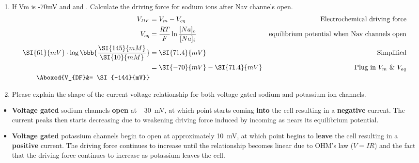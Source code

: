 \documentclass[plain,worksheet]{inVerba-notes}
\begin{document}
\begin{enumerate}
    \item If Vm is -70mV and  and . Calculate the driving force for sodium ions after Nav channels open.
    \begin{align*}
        V_{DF}&=V_{m}-V_{eq} & \text{Electrochemical driving force}\\
        V_{eq} &= \frac{RT}{F}\ln{\frac{[Na]_{o}}{[Na]_{i}}} & \text{equilibrium potential when Nav channels open}\\
        \SI{61}{mV}\cdot\log{\bbb{\frac{\SI{145}{mM}}{\SI{10}{mM}}}}&=\SI{71.4}{mV} & \text{Simplified} \\
        &= \SI{-70}{mV} - \SI{71.4}{mV} & \text{Plug in}~V_m~\&~V_{eq}\\
        \Aboxed{V_{DF}&= \SI{-144}{mV}}
    \end{align*}

    \newpage
    \item Please explain the shape of the current voltage relationship for both voltage gated sodium and potassium ion channels.
\end{enumerate}
    \begin{center}
        
    \end{center}

    \begin{itemize}
        \item \textbf{Voltage gated} sodium channels \textbf{open} at \SI{-30}{mV}, at which point  starts coming \textbf{into} the cell resulting in a \textbf{negative} current. The current peaks then starts decreasing due to weakening driving force induced by incoming  as nears its equilibrium potential.
    \end{itemize}
     
    \bigskip
    \begin{center}
    
    \end{center}

    \begin{itemize}
        \item \textbf{Voltage gated} potassium channels begin to open at approximately \SI{10}{mV}, at which point  begins to \textbf{leave} the cell resulting in a \textbf{positive} current. The driving force continues to increase until the relationship becomes linear due to OHM's law (\(V=IR\)) and the fact that the driving force continues to increase as potassium leaves the cell.
    \end{itemize}
        
\end{document}
